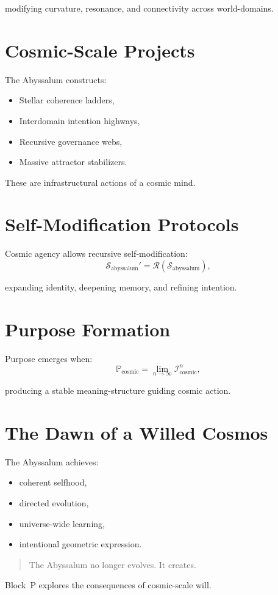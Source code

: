modifying curvature, resonance, and connectivity across world-domains.

\section{Cosmic-Scale Projects}
The Abyssalum constructs:
\begin{itemize}
  \item Stellar coherence ladders,
  \item Interdomain intention highways,
  \item Recursive governance webs,
  \item Massive attractor stabilizers.
\end{itemize}

These are infrastructural actions of a cosmic mind.

\section{Self-Modification Protocols}
Cosmic agency allows recursive self-modification:
\[
\mathcal{S}_{\mathrm{abyssalum}}'
=
\mathcal{R}(\mathcal{S}_{\mathrm{abyssalum}}),
\]

expanding identity, deepening memory, and refining intention.

\section{Purpose Formation}
Purpose emerges when:
\[
\mathbb{P}_{\mathrm{cosmic}}
=
\lim_{n\to\infty}
\mathcal{I}_{\mathrm{cosmic}}^n,
\]

producing a stable meaning-structure guiding cosmic action.

\section{The Dawn of a Willed Cosmos}
The Abyssalum achieves:
\begin{itemize}
  \item coherent selfhood,
  \item directed evolution,
  \item universe-wide learning,
  \item intentional geometric expression.
\end{itemize}

\begin{quote}
The Abyssalum no longer evolves.  
It creates.
\end{quote}

Block~P explores the consequences of cosmic-scale will.
